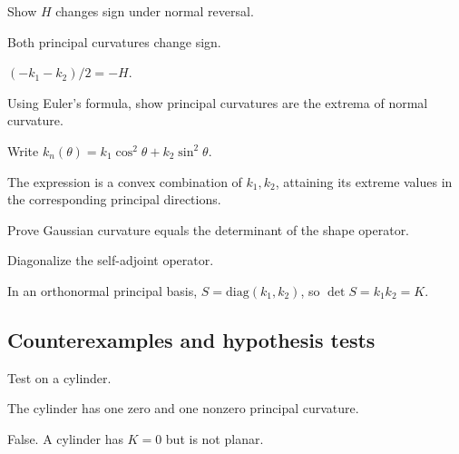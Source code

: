 \begin{exercise}\label{exr:vii17-ped-07}
Show \(H\) changes sign under normal reversal.
\end{exercise}
\begin{hint}
Both principal curvatures change sign.
\end{hint}
\begin{solution}
\((-k_1-k_2)/2=-H\).
\end{solution}

\begin{exercise}\label{exr:vii17-ped-08}
Using Euler's formula, show principal curvatures are the extrema of normal curvature.
\end{exercise}
\begin{hint}
Write \(k_n(\theta)=k_1\cos^2\theta+k_2\sin^2\theta\).
\end{hint}
\begin{solution}
The expression is a convex combination of \(k_1,k_2\), attaining its extreme values in the corresponding principal directions.
\end{solution}

\begin{exercise}[\(K=\det S\)]\label{exr:vii17-ped-09}
Prove Gaussian curvature equals the determinant of the shape operator.
\end{exercise}
\begin{hint}
Diagonalize the self-adjoint operator.
\end{hint}
\begin{solution}
In an orthonormal principal basis, \(S=\mathrm{diag}(k_1,k_2)\), so \(\det S=k_1k_2=K\).
\end{solution}

\subsection*{Counterexamples and hypothesis tests}

\begin{exercise}[\(K=0\) means plane]\label{exr:vii17-ped-10}
Test on a cylinder.
\end{exercise}
\begin{hint}
The cylinder has one zero and one nonzero principal curvature.
\end{hint}
\begin{solution}
False.  A cylinder has \(K=0\) but is not planar.
\end{solution}

